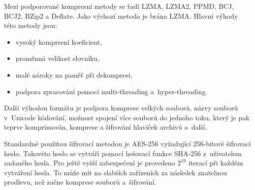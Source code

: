  Mezi podporované kompresní metody se řadí LZMA, LZMA2, PPMD, BCJ, BCJ2, BZip2 a
Deflate. Jako výchozí metoda je brána LZMA. Hlavní výhody této metody jsou:
\begin{itemize}
    \item vysoký kompresní koeficient,
    \item proměnná velikost slovníku,
    \item malé nároky na paměť při dekompresi,
    \item podpora zpracování pomocí multi-threading a~hyper-threading.
\end{itemize}
Další výhodou formátu je podpora komprese velkých souborů, názvy souborů v~Unicode
kódování, možnost spojení více souborů do jednoho toku, který je pak teprve komprimován, komprese
a šifrování hlaviček archivů a~další.

 Standardně použitou šifrovací metodou je AES-256 vyžadující 256-bitové šifrovací heslo.
Takovéto heslo se vytváří pomocí hešovací funkce SHA-256 z~uživatelem zadaného hesla. Pro ještě
vyšší zabezpečení je provedeno \(2^{19}\) iterací při každém vytváření hesla. To může mít na
slabších zařízeních za následek znatelnou prodlevu, než začne komprese souborů a~šifrování.

